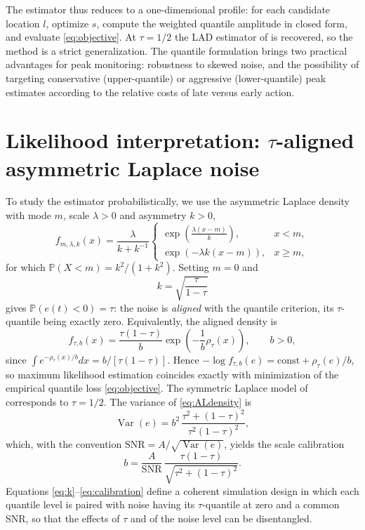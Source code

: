 \documentclass[11pt,a4paper]{article}
\begin{document}
The estimator thus reduces to a one-dimensional profile: for each candidate
location $l$, optimize $s$, compute the weighted quantile amplitude in closed
form, and evaluate \eqref{eq:objective}. At $\tau=1/2$ the LAD estimator of
\citet{Dermoune} is recovered, so the method is a strict generalization. The
quantile formulation brings two practical advantages for peak monitoring:
robustness to skewed noise, and the possibility of targeting conservative
(upper-quantile) or aggressive (lower-quantile) peak estimates according to
the relative costs of late versus early action.

\section{Likelihood interpretation: \texorpdfstring{$\tau$}{tau}-aligned asymmetric Laplace noise}
\label{sec:al}

To study the estimator probabilistically, we use the asymmetric Laplace
density with mode $m$, scale $\lambda>0$ and asymmetry $k>0$,
\[
f_{m,\lambda,k}(x)=\frac{\lambda}{k+k^{-1}}
\begin{cases}
\exp\!\left(\frac{\lambda(x-m)}{k}\right), & x<m,\\[4pt]
\exp\!\left(-\lambda k(x-m)\right), & x\ge m,
\end{cases}
\]
for which $\mathbb P(X<m)=k^2/(1+k^2)$. Setting $m=0$ and
\begin{equation}
k=\sqrt{\frac{\tau}{1-\tau}}
\label{eq:k}
\end{equation}
gives $\mathbb P(e(t)<0)=\tau$: the noise is \emph{aligned} with the
quantile criterion, its $\tau$-quantile being exactly zero. Equivalently, the
aligned density is
\begin{equation}
f_{\tau,b}(x)=\frac{\tau(1-\tau)}{b}
\exp\!\left(-\frac{1}{b}\rho_\tau(x)\right),
\qquad b>0,
\label{eq:ALdensity}
\end{equation}
since $\int e^{-\rho_\tau(x)/b}dx=b/[\tau(1-\tau)]$. Hence
$-\log f_{\tau,b}(e)=\text{const}+\rho_\tau(e)/b$, so maximum likelihood
estimation coincides exactly with minimization of the empirical quantile loss
\eqref{eq:objective}. The symmetric Laplace model of \citet{Dermoune}
corresponds to $\tau=1/2$. The variance of \eqref{eq:ALdensity} is
\begin{equation}
\operatorname{Var}(e)=b^2\,\frac{\tau^2+(1-\tau)^2}{\tau^2(1-\tau)^2},
\label{eq:variance}
\end{equation}
which, with the convention
$\mathrm{SNR}=A/\sqrt{\operatorname{Var}(e)}$, yields the scale calibration
\begin{equation}
b=\frac{A}{\mathrm{SNR}}\,
\frac{\tau(1-\tau)}{\sqrt{\tau^2+(1-\tau)^2}}.
\label{eq:calibration}
\end{equation}
Equations \eqref{eq:k}--\eqref{eq:calibration} define a coherent simulation
design in which each quantile level is paired with noise having its
$\tau$-quantile at zero and a common SNR, so that the effects of $\tau$ and of
the noise level can be disentangled.
\end{document}
